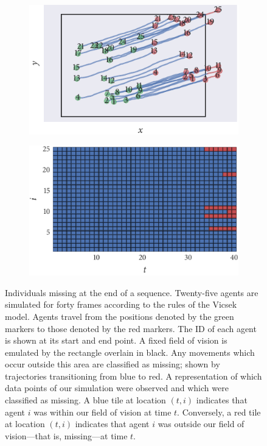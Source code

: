 \begin{figure}[tbp]
  \begin{subfigure}[b]{0.5\textwidth}
    \includegraphics{end/data.pdf}
    \caption{}
    \label{subfig:end_data}
  \end{subfigure}%
  \begin{subfigure}[b]{0.5\textwidth}
    \includegraphics{end/missing_array.pdf}
    \caption{}
    \label{subfig:end_missing}
  \end{subfigure}
  \caption{Individuals missing at the end of a sequence.
   Twenty-five agents are simulated for forty frames
  according to the rules of the Vicsek model. Agents travel from the positions
  denoted by the green markers to those denoted by the red markers. The ID of
  each agent is shown at its start and end point. A fixed field of vision is
  emulated by the rectangle overlain in black. Any movements which occur
  outside this area are classified as missing; shown by trajectories
  transitioning from blue to red.
   A representation of which data points of our
  simulation were observed and which were classified as missing. A blue tile at
  location $(t, i)$ indicates that agent $i$ was within our field of vision at
  time $t$. Conversely, a red tile at location $(t, i)$ indicates that agent
  $i$ was outside our field of vision---that is, missing---at time $t$.}
  \label{fig:end_data}
\end{figure}

